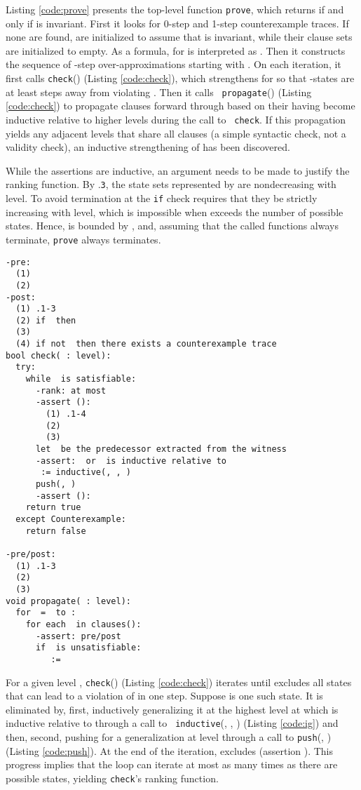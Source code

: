 \documentclass{llncs}
\begin{document}
Listing \ref{code:prove} presents the top-level function {\tt prove},
which returns  if and only if  is invariant.  First it
looks for 0-step and 1-step counterexample traces.  If none are found,
 are initialized to assume that  is invariant,
while their clause sets are initialized to empty.  As a formula, 
for  is interpreted as .  Then it constructs the sequence of -step
over-approximations starting with .  On each iteration, it first
calls {\tt check}() (Listing \ref{code:check}), which strengthens
 for  so that -states are at least
 steps away from violating .  Then it calls {\tt
  propagate}() (Listing \ref{code:check}) to propagate clauses
forward through  based on their having
become inductive relative to higher levels during the call to {\tt
  check}.  If this propagation yields any adjacent levels that share
all clauses (a simple syntactic check, not a validity check), an
inductive strengthening of  has been discovered.

While the assertions are inductive, an argument needs to be made to
justify the ranking function.  By .{\tt 3}, the state sets
represented by  are nondecreasing with
level.  To avoid termination at the {\tt if} check requires that they
be strictly increasing with level, which is impossible when 
exceeds the number of possible states.  Hence,  is bounded by
, and, assuming that the called functions always
terminate, {\tt prove} always terminates.

\begin{lstlisting}[name=code,caption={The {\tt check} and {\tt propagate} functions},label=code:check,float=tb]
-pre:  
  (1) 
  (2) 
-post: 
  (1) .1-3
  (2) if  then 
  (3) 
  (4) if not  then there exists a counterexample trace
bool check( : level):
  try:
    while  is satisfiable:
      -rank: at most 
      -assert ():
        (1) .1-4
        (2) 
        (3) 
      let  be the predecessor extracted from the witness
      -assert:  or  is inductive relative to 
       := inductive(, , )
      push(, )
      -assert (): 
    return true
  except Counterexample:
    return false

-pre/post:
  (1) .1-3
  (2) 
  (3) 
void propagate( : level):
  for  =  to :
    for each  in clauses():
      -assert: pre/post
      if  is unsatisfiable:
         := 
\end{lstlisting}

For a given level , {\tt check}() (Listing \ref{code:check})
iterates until  excludes all states that can lead to a violation
of  in one step.  Suppose  is one such state.  It is eliminated
by, first, inductively generalizing it at the highest level  at
which  is inductive relative to  through a call to {\tt
  inductive}(, , ) (Listing \ref{code:ig}) and then,
second, pushing for a generalization at level  through a call to
{\tt push}(, ) (Listing \ref{code:push}).  At the
end of the iteration,  excludes  (assertion ).  This
progress implies that the loop can iterate at most as many times as
there are possible states, yielding {\tt check}'s ranking function.
\end{document}
